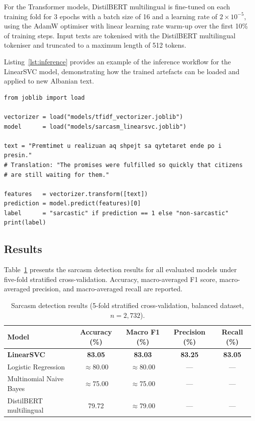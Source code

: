 \documentclass[12pt,a4paper]{article}
\begin{document}
For the Transformer models, DistilBERT multilingual is fine-tuned on each training fold for 3 epochs with a batch size of 16 and a learning rate of $2\times10^{-5}$, using the AdamW optimiser with linear learning rate warm-up over the first 10\% of training steps. Input texts are tokenised with the DistilBERT multilingual tokeniser and truncated to a maximum length of 512 tokens.

Listing~\ref{lst:inference} provides an example of the inference workflow for the LinearSVC model, demonstrating how the trained artefacts can be loaded and applied to new Albanian text.

\begin{lstlisting}[style=pythonstyle, caption={Example inference using the trained LinearSVC sarcasm detector.}, label={lst:inference}]
from joblib import load

vectorizer = load("models/tfidf_vectorizer.joblib")
model      = load("models/sarcasm_linearsvc.joblib")

text = "Premtimet u realizuan aq shpejt sa qytetaret ende po i presin."
# Translation: "The promises were fulfilled so quickly that citizens
# are still waiting for them."

features   = vectorizer.transform([text])
prediction = model.predict(features)[0]
label      = "sarcastic" if prediction == 1 else "non-sarcastic"
print(label)
\end{lstlisting}

\subsection{Results}
\label{subsec:sarcasm_results}

Table~\ref{tab:sarcasm} presents the sarcasm detection results for all evaluated models under five-fold stratified cross-validation. Accuracy, macro-averaged F1 score, macro-averaged precision, and macro-averaged recall are reported.

\begin{table}[H]
    \centering
    \caption{Sarcasm detection results (5-fold stratified cross-validation, balanced dataset, $n=2{,}732$).}
    \label{tab:sarcasm}
    \begin{tabular}{lcccc}
        \toprule
        \textbf{Model} & \textbf{Accuracy (\%)} & \textbf{Macro F1 (\%)} & \textbf{Precision (\%)} & \textbf{Recall (\%)} \\
        \midrule
        \textbf{LinearSVC}          & \textbf{83.05} & \textbf{83.03} & \textbf{83.25} & \textbf{83.05} \\
        Logistic Regression         & $\approx$80.00 & $\approx$80.00 & ---            & ---            \\
        Multinomial Naive Bayes     & $\approx$75.00 & $\approx$75.00 & ---            & ---            \\
        DistilBERT multilingual     & 79.72          & $\approx$79.00 & ---            & ---            \\
        \bottomrule
    \end{tabular}
\end{table}
\end{document}
